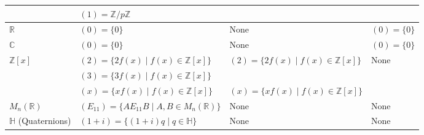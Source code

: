 \documentclass[11pt,openany]{article}
\begin{document}
\begin{center}
\begin{tabular}{|>{\centering\arraybackslash}m{4cm}|>{\centering\arraybackslash}m{4cm}|>{\centering\arraybackslash}m{4cm}|>{\centering\arraybackslash}m{4cm}|}
	& \((1) = \mathbb{Z}/p\mathbb{Z}\) &  &  \\
	\hline
	\(\mathbb{R}\) & \((0) = \{0\}\) & None & \((0) = \{0\}\) \\
	\hline
	\(\mathbb{C}\) & \((0) = \{0\}\) & None & \((0) = \{0\}\) \\
	\hline
	\(\mathbb{Z}[x]\) & \((2) = \{2 f(x) \mid f(x) \in \mathbb{Z}[x]\}\) & \((2) = \{2 f(x) \mid f(x) \in \mathbb{Z}[x]\}\) & None \\
	& \((3) = \{3 f(x) \mid f(x) \in \mathbb{Z}[x]\}\) &  &  \\
	& \((x) = \{x f(x) \mid f(x) \in \mathbb{Z}[x]\}\) & \((x) = \{x f(x) \mid f(x) \in \mathbb{Z}[x]\}\) &  \\
	\hline
	\(M_n(\mathbb{R})\) & \((E_{11}) = \{A E_{11} B \mid A, B \in M_n(\mathbb{R})\}\) & None & None \\
	\hline
	\(\mathbb{H}\) (Quaternions) & \((1+i) = \{(1+i) q \mid q \in \mathbb{H}\}\) & None & None \\
	\hline
\end{tabular}
\end{center}
\end{document}
